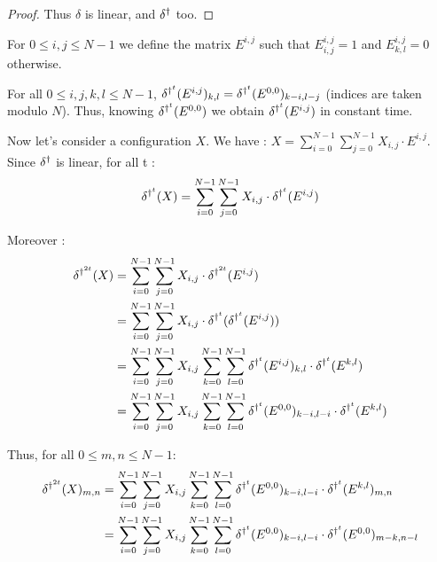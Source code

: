 \begin{proof}
Thus $\delta$ is linear, and $\delta^{\dag}$ too.
\end{proof}


\begin{defi}
 For $0 \leq i,j \leq N-1$ we define the matrix $E^{i,j}$ such that $E^{i,j}_{i,j} = 1$ and $E^{i,j}_{k,l} = 0$ otherwise.
\end{defi}

\begin{lemma}
 For all $0 \leq i, j, k, l \leq N-1$, $\delta^{\dag^t}(E^{i,j})_{k,l} = \delta^{\dag^t}(E^{0,0})_{k-i,l-j}$ (indices are taken modulo $N$). Thus, knowing $\delta^{\dag^t}(E^{0,0})$ we obtain $\delta^{\dag^t}(E^{i,j})$ in constant time.
\end{lemma}

Now let's consider a configuration $X$. We have : $X = \sum_{i=0}^{N-1} \sum_{j=0}^{N-1} X_{i,j} \cdot E^{i,j}$. Since $\delta^{\dag}$ is linear, for all t : 
\[ \delta^{\dag^t} (X) = \sum_{i=0}^{N-1} \sum_{j=0}^{N-1} X_{i,j} \cdot \delta^{\dag^t} (E^{i,j})\]
 
Moreover : 
\begin{equation}
 \label{expanddelta}
 \begin{split}
    \delta^{\dag^{2t}} (X) & = \sum_{i=0}^{N-1} \sum_{j=0}^{N-1} X_{i,j} \cdot \delta^{\dag^{2t}} (E^{i,j}) \\
		  & = \sum_{i=0}^{N-1} \sum_{j=0}^{N-1} X_{i,j} \cdot \delta^{\dag^t}(\delta^{\dag^t} (E^{i,j})) \\
		  & = \sum_{i=0}^{N-1} \sum_{j=0}^{N-1} X_{i,j} \sum_{k=0}^{N-1} \sum_{l=0}^{N-1} \delta^{\dag^t} (E^{i,j})_{k,l} \cdot \delta^{\dag^t} (E^{k,l}) \\
		  & = \sum_{i=0}^{N-1} \sum_{j=0}^{N-1} X_{i,j} \sum_{k=0}^{N-1} \sum_{l=0}^{N-1} \delta^{\dag^t} (E^{0,0})_{k-i,l-i} \cdot \delta^{\dag^t} (E^{k,l})
 \end{split}
\end{equation}

Thus, for all $0 \leq m, n \leq N-1$:
\begin{equation}
 \label{aveq}
 \begin{split}
    \delta^{\dag^{2t}} (X)_{m,n} & = \sum_{i=0}^{N-1} \sum_{j=0}^{N-1} X_{i,j} \sum_{k=0}^{N-1} \sum_{l=0}^{N-1} \delta^{\dag^t} (E^{0,0})_{k-i,l-i} \cdot \delta^{\dag^t} (E^{k,l})_{m,n} \\
                        & = \sum_{i=0}^{N-1} \sum_{j=0}^{N-1} X_{i,j} \sum_{k=0}^{N-1} \sum_{l=0}^{N-1} \delta^{\dag^t} (E^{0,0})_{k-i,l-i} \cdot \delta^{\dag^t} (E^{0,0})_{m-k,n-l}
 \end{split}
\end{equation}

